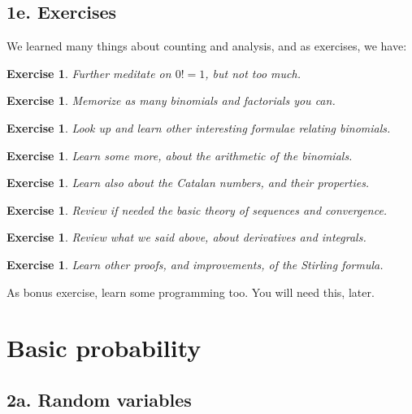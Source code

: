 \documentclass[12pt]{amsbook}
\newtheorem{exercise}[theorem]{Exercise}
\begin{document}
\section*{1e. Exercises}

We learned many things about counting and analysis, and as exercises, we have:

\begin{exercise}
Further meditate on $0!=1$, but not too much.
\end{exercise}

\begin{exercise}
Memorize as many binomials and factorials you can.
\end{exercise}

\begin{exercise}
Look up and learn other interesting formulae relating binomials.
\end{exercise}

\begin{exercise}
Learn some more, about the arithmetic of the binomials.
\end{exercise}

\begin{exercise}
Learn also about the Catalan numbers, and their properties.
\end{exercise}

\begin{exercise}
Review if needed the basic theory of sequences and convergence.
\end{exercise}

\begin{exercise}
Review what we said above, about derivatives and integrals.
\end{exercise}

\begin{exercise}
Learn other proofs, and improvements, of the Stirling formula.
\end{exercise}

As bonus exercise, learn some programming too. You will need this, later.

\chapter{Basic probability}

\section*{2a. Random variables}
\end{document}
